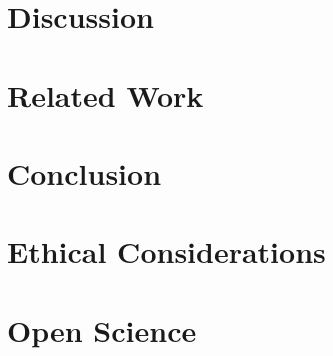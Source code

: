 \documentclass[letterpaper,twocolumn,10pt]{article}
\theoremstyle{remark}
\begin{document}
\section{Discussion}
\label{sec:discussion}


\section{Related Work}
\label{sec:related}


\section{Conclusion}
\label{sec:conclusion}



\clearpage
\appendix
\section*{Ethical Considerations}


\section*{Open Science}






\end{document}
